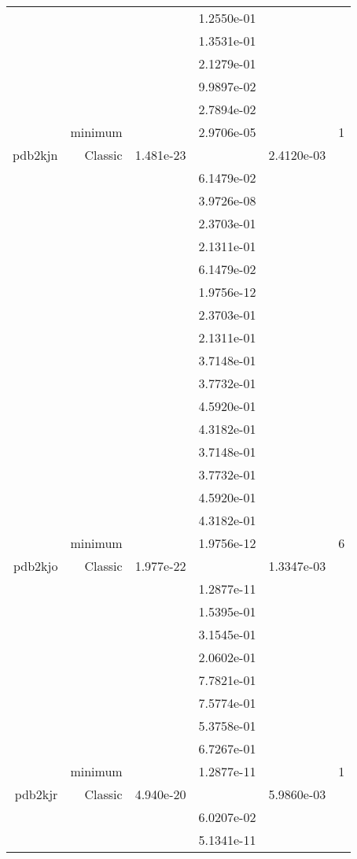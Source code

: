 \begin{xltabular}{\textwidth}{r|rS[table-format=1.3e+2]S[table-format=1.4e+2]S[table-format=1.4e+2]S[table-format=-1.5]}
&  &  & 1.2550e-01 & & \\
&  &  & 1.3531e-01 & & \\
&  &  & 2.1279e-01 & & \\
&  &  & 9.9897e-02 & & \\
&  &  & 2.7894e-02 & & \\
& minimum &  & 2.9706e-05 & & 1 \\  \addlinespace
pdb2kjn & Classic & 1.481e-23 &  & 2.4120e-03 & \\
&  &  & 6.1479e-02 & & \\
&  &  & 3.9726e-08 & & \\
&  &  & 2.3703e-01 & & \\
&  &  & 2.1311e-01 & & \\
&  &  & 6.1479e-02 & & \\
&  &  & 1.9756e-12 & & \\
&  &  & 2.3703e-01 & & \\
&  &  & 2.1311e-01 & & \\
&  &  & 3.7148e-01 & & \\
&  &  & 3.7732e-01 & & \\
&  &  & 4.5920e-01 & & \\
&  &  & 4.3182e-01 & & \\
&  &  & 3.7148e-01 & & \\
&  &  & 3.7732e-01 & & \\
&  &  & 4.5920e-01 & & \\
&  &  & 4.3182e-01 & & \\
& minimum &  & 1.9756e-12 & & 6 \\  \addlinespace
pdb2kjo & Classic & 1.977e-22 &  & 1.3347e-03 & \\
&  &  & 1.2877e-11 & & \\
&  &  & 1.5395e-01 & & \\
&  &  & 3.1545e-01 & & \\
&  &  & 2.0602e-01 & & \\
&  &  & 7.7821e-01 & & \\
&  &  & 7.5774e-01 & & \\
&  &  & 5.3758e-01 & & \\
&  &  & 6.7267e-01 & & \\
& minimum &  & 1.2877e-11 & & 1 \\  \addlinespace
pdb2kjr & Classic & 4.940e-20 &  & 5.9860e-03 & \\
&  &  & 6.0207e-02 & & \\
&  &  & 5.1341e-11 & & \\

\end{xltabular}
